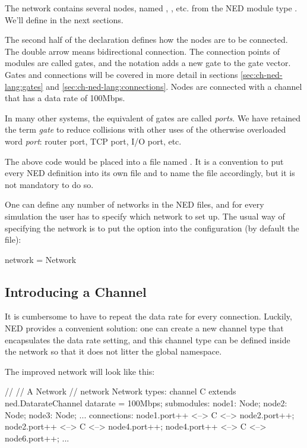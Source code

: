 The network contains several nodes, named , , etc.
from the NED module type . We'll define  in the next
sections.

The second half of the declaration defines how the nodes are to be
connected. The double arrow means bidirectional connection. The connection
points of modules are called gates, and the  notation adds a
new gate to the  gate vector. Gates and connections will be
covered in more detail in sections \ref{sec:ch-ned-lang:gates} and
\ref{sec:ch-ned-lang:connections}. Nodes are connected with a channel that
has a data rate of 100Mbps.

\begin{note}
    In many other systems, the equivalent of {\opp} gates are called
    \textit{ports}. We have retained the term \textit{gate} to reduce
    collisions with other uses of the otherwise overloaded word
    \textit{port}: router port, TCP port, I/O port, etc.
\end{note}

The above code would be placed into a file named . It is
a convention to put every NED definition into its own file and to name the
file accordingly, but it is not mandatory to do so.

One can define any number of networks in the NED files, and for every
simulation the user has to specify which network to set up.
The usual way of specifying the network is to put the 
option into the configuration (by default the  file):

\begin{inifile}
[General]
network = Network
\end{inifile}


\subsection{Introducing a Channel}

It is cumbersome to have to repeat the data rate for every connection.
Luckily, NED provides a convenient solution: one can create a new channel
type that encapsulates the data rate setting, and this channel type can
be defined inside the network so that it does not litter the global
namespace.

The improved network will look like this:

\begin{ned}
//
// A Network
//
network Network
{
    types:
        channel C extends ned.DatarateChannel {
            datarate = 100Mbps;
        }
    submodules:
        node1: Node;
        node2: Node;
        node3: Node;
        ...
    connections:
        node1.port++ <--> C <--> node2.port++;
        node2.port++ <--> C <--> node4.port++;
        node4.port++ <--> C <--> node6.port++;
        ...
}
\end{ned}


